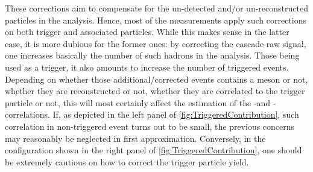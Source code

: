 These corrections aim to compensate for the un-detected and/or un-reconstructed particles in the analysis. Hence, most of the measurements apply such corrections on both trigger and associated particles. While this makes sense in the latter case, it is more dubious for the former ones: by correcting the cascade raw signal, one increases basically the number of such hadrons in the analysis. Those being used as a trigger, it also amounts to increase the number of triggered events. Depending on whether those additional/corrected events contains a \rmPhiMes meson or not, whether they are reconstructed or not, whether they are correlated to the trigger particle or not, this will most certainly affect the estimation of the \rmXiPM-\rmPhiMes and \rmOmegaPM-\rmPhiMes correlations. If, as depicted in the left panel of \fig\ref{fig:TriggeredContribution}, such correlation in non-triggered event turns out to be small, the previous concerns may reasonably be neglected in first approximation. Conversely, in the configuration shown in the right panel of \fig\ref{fig:TriggeredContribution}, one should be extremely cautious on how to correct the trigger particle yield.

